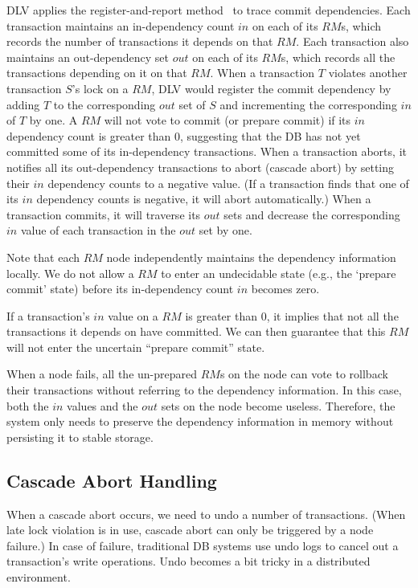 \documentclass[conference]{IEEEtran}
\begin{document}
DLV applies the register-and-report method~\cite{HeckatonMVCC:journals/pvldb/LarsonBDFPZ11} to trace commit dependencies.
Each transaction maintains an in-dependency count ${in}$ on each of its ${RM}$s, which records the number of transactions it depends on that ${RM}$.
Each transaction also maintains an out-dependency set  ${out}$ on each of its ${RM}$s, which records all the transactions depending on it on that ${RM}$.
When a transaction ${T}$ violates another transaction ${S}$'s lock on a ${RM}$,
DLV would register the commit dependency by adding ${T}$ to the corresponding ${out}$ set of ${S}$ and incrementing the corresponding ${in}$ of ${T}$ by one.
A ${RM}$ will not vote to commit (or prepare commit) if its ${in}$ dependency count is greater than 0, suggesting that the DB has not yet committed some of its in-dependency transactions.
When a transaction aborts, it notifies all its out-dependency transactions to abort (cascade abort) by setting their ${in}$ dependency counts to a negative value.
(If a transaction finds that one of its ${in}$ dependency counts is negative, it will abort automatically.)
When a transaction commits, it will traverse its ${out}$ sets and decrease the corresponding ${in}$ value of each transaction in the ${out}$ set by one.

Note that each $RM$ node independently maintains the dependency information locally.
We do not allow a ${RM}$ to enter an undecidable state (e.g., the `prepare commit' state) before its in-dependency count ${in}$ becomes zero.

If a transaction's ${in}$ value on a ${RM}$ is greater than 0, it implies that not all the transactions it depends on have committed.
We can then guarantee that this ${RM}$ will not enter the uncertain ``prepare commit'' state.

When a node fails, all the un-prepared ${RM}$s on the node can vote to rollback their transactions without referring to the dependency information.
In this case, both the ${in}$ values and the ${out}$ sets on the node become useless.
Therefore, the system only needs to preserve the dependency information in memory without persisting it to stable storage.

\subsection{Cascade Abort Handling}
When a cascade abort occurs,
we need to undo a number of transactions.
(When late lock violation is in use, cascade abort can only be triggered by a node failure.)
In case of failure, traditional DB systems use undo logs to cancel out a transaction's write operations.
Undo becomes a bit tricky in a distributed environment.
\end{document}
